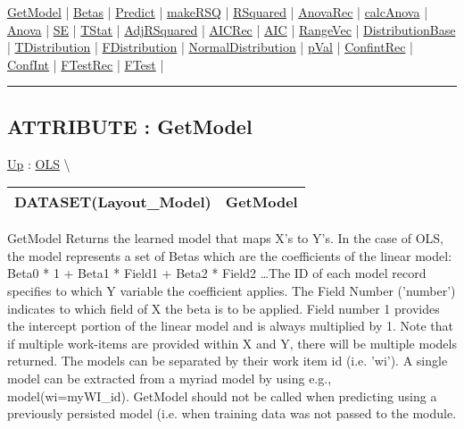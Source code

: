 \hyperlink{ecldoc:linearregression.ols.getmodel}{GetModel}  |
\hyperlink{ecldoc:linearregression.ols.betas}{Betas}  |
\hyperlink{ecldoc:linearregression.ols.predict}{Predict}  |
\hyperlink{ecldoc:linearregression.ols.makersq}{makeRSQ}  |
\hyperlink{ecldoc:linearregression.ols.rsquared}{RSquared}  |
\hyperlink{ecldoc:linearregression.ols.anovarec}{AnovaRec}  |
\hyperlink{ecldoc:linearregression.ols.calcanova}{calcAnova}  |
\hyperlink{ecldoc:linearregression.ols.anova}{Anova}  |
\hyperlink{ecldoc:linearregression.ols.se}{SE}  |
\hyperlink{ecldoc:linearregression.ols.tstat}{TStat}  |
\hyperlink{ecldoc:linearregression.ols.adjrsquared}{AdjRSquared}  |
\hyperlink{ecldoc:linearregression.ols.aicrec}{AICRec}  |
\hyperlink{ecldoc:linearregression.ols.aic}{AIC}  |
\hyperlink{ecldoc:linearregression.ols.rangevec}{RangeVec}  |
\hyperlink{ecldoc:linearregression.ols.distributionbase}{DistributionBase}  |
\hyperlink{ecldoc:linearregression.ols.tdistribution}{TDistribution}  |
\hyperlink{ecldoc:linearregression.ols.fdistribution}{FDistribution}  |
\hyperlink{ecldoc:linearregression.ols.normaldistribution}{NormalDistribution}  |
\hyperlink{ecldoc:linearregression.ols.pval}{pVal}  |
\hyperlink{ecldoc:linearregression.ols.confintrec}{ConfintRec}  |
\hyperlink{ecldoc:linearregression.ols.confint}{ConfInt}  |
\hyperlink{ecldoc:linearregression.ols.ftestrec}{FTestRec}  |
\hyperlink{ecldoc:linearregression.ols.ftest}{FTest}  |

\rule{\linewidth}{0.5pt}

\subsection*{ATTRIBUTE : GetModel}
\hypertarget{ecldoc:linearregression.ols.getmodel}{}
\hyperlink{ecldoc:linearregression.ols}{Up} :
\hspace{0pt} \hyperlink{ecldoc:linearregression.ols}{OLS} \textbackslash 

{\renewcommand{\arraystretch}{1.5}
\begin{tabularx}{\textwidth}{|>{\raggedright\arraybackslash}l|X|}
\hline
\hspace{0pt}DATASET(Layout\_Model) & GetModel \\
\hline
\end{tabularx}
}

\par
GetModel Returns the learned model that maps X's to Y's. In the case of OLS, the model represents a set of Betas which are the coefficients of the linear model: Beta0 * 1 + Beta1 * Field1 + Beta2 * Field2 \ldots The ID of each model record specifies to which Y variable the coefficient applies. The Field Number ('number') indicates to which field of X the beta is to be applied. Field number 1 provides the intercept portion of the linear model and is always multiplied by 1. Note that if multiple work-items are provided within X and Y, there will be multiple models returned. The models can be separated by their work item id (i.e. 'wi'). A single model can be extracted from a myriad model by using e.g., model(wi=myWI\_id). GetModel should not be called when predicting using a previously persisted model (i.e. when training data was not passed to the module.


